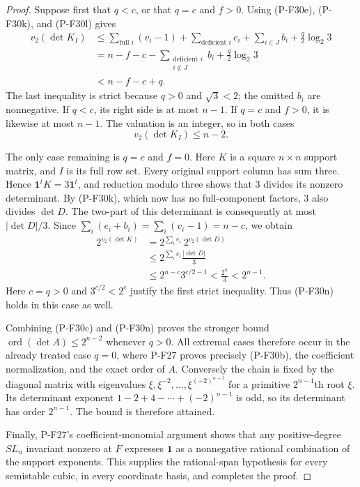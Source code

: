 \begin{proof}
Suppose first that $q<c$, or that $q=c$ and $f>0$.
Using (P-F30e), (P-F30k), and (P-F30l) gives
\begin{align*}
 v_2(\det K_I)
 &\le \sum_{\text{full }i}(v_i-1)
      +\sum_{\text{deficient }i}e_i
      +\sum_{i\in J}b_i+\frac q2\log_2 3\\
 &=n-f-c-\sum_{\substack{\text{deficient }i\\i\notin J}}b_i
              +\frac q2\log_2 3\\
 &<n-f-c+q.
 \tag{P-F30m}
\end{align*}
The last inequality is strict because $q>0$
and $\sqrt3<2$; the omitted $b_i$ are nonnegative.
If $q<c$, its right side is at most $n-1$.
If $q=c$ and $f>0$, it is likewise at most $n-1$.
The valuation is an integer, so in both cases
\[
 v_2(\det K_I)\le n-2.
 \tag{P-F30n}
\]

The only case remaining is $q=c$ and $f=0$.
Here $K$ is a square $n\times n$ support matrix,
and $I$ is its full row set. Every original
support column has sum three. Hence
$\mathbf1^tK=3\mathbf1^t$, and reduction modulo
three shows that $3$ divides its nonzero determinant.
By (P-F30k), which now has no full-component
factors, $3$ also divides $\det D$.
The two-part of this determinant is consequently
at most $|\det D|/3$. Since
$\sum_i(e_i+b_i)=\sum_i(v_i-1)=n-c$,
we obtain
\begin{align*}
 2^{v_2(\det K)}
 &=2^{\sum_i e_i}\,2^{v_2(\det D)}\\
 &\le 2^{\sum_i e_i}\frac{|\det D|}{3}\\
 &\le 2^{n-c}3^{c/2-1}
  <\frac{2^n}{3}
  <2^{n-1}.
 \tag{P-F30o}
\end{align*}
Here $c=q>0$ and $3^{c/2}<2^c$ justify the
first strict inequality. Thus (P-F30n) holds
in this case as well.

Combining (P-F30c) and (P-F30n) proves the
stronger bound
$\operatorname{ord}(\det A)\le2^{n-2}$
whenever $q>0$. All extremal cases therefore
occur in the already treated case $q=0$,
where P-F27 proves precisely (P-F30b), the
coefficient normalization, and the exact order
of $A$. Conversely the chain is fixed by
the diagonal matrix with eigenvalues
$\xi,\xi^{-2},\ldots,\xi^{(-2)^{n-1}}$
for a primitive $2^{n-1}$th root $\xi$.
Its determinant exponent
$1-2+4-\cdots+(-2)^{n-1}$ is odd, so its
determinant has order $2^{n-1}$. The bound
is therefore attained.

Finally, P-F27's coefficient-monomial argument
shows that any positive-degree $SL_n$ invariant
nonzero at $F$ expresses $\mathbf1$ as a
nonnegative rational combination of the
support exponents. This supplies the
rational-span hypothesis for every semistable
cubic, in every coordinate basis, and completes
the proof.
\end{proof}

